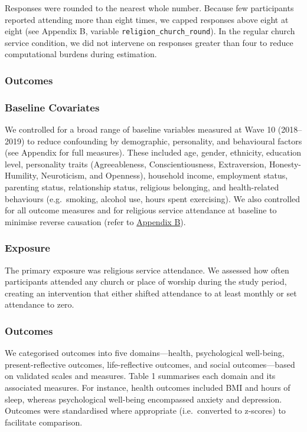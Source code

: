 \documentclass[
  single column]{article}
\begin{document}
Responses were rounded to the nearest whole number. Because few
participants reported attending more than eight times, we capped
responses above eight at eight (see Appendix B, variable
\texttt{religion\_church\_round}). In the regular church service
condition, we did not intervene on responses greater than four to reduce
computational burdens during estimation.

\subsubsection{Outcomes}\label{outcomes}

\subsubsection{Baseline Covariates}\label{baseline-covariates}

We controlled for a broad range of baseline variables measured at Wave
10 (2018--2019) to reduce confounding by demographic, personality, and
behavioural factors (see Appendix for full measures). These included
age, gender, ethnicity, education level, personality traits
(Agreeableness, Conscientiousness, Extraversion, Honesty-Humility,
Neuroticism, and Openness), household income, employment status,
parenting status, relationship status, religious belonging, and
health-related behaviours (e.g.~smoking, alcohol use, hours spent
exercising). We also controlled for all outcome measures and for
religious service attendance at baseline to minimise reverse causation
(refer to \href{appendix-baseline}{Appendix B}).

\subsubsection{Exposure}\label{exposure}

The primary exposure was religious service attendance. We assessed how
often participants attended any church or place of worship during the
study period, creating an intervention that either shifted attendance to
at least monthly or set attendance to zero.

\subsubsection{Outcomes}\label{outcomes-1}

We categorised outcomes into five domains---health, psychological
well-being, present-reflective outcomes, life-reflective outcomes, and
social outcomes---based on validated scales and measures. Table 1
summarises each domain and its associated measures. For instance, health
outcomes included BMI and hours of sleep, whereas psychological
well-being encompassed anxiety and depression. Outcomes were
standardised where appropriate (i.e.~converted to z-scores) to
facilitate comparison.
\end{document}
